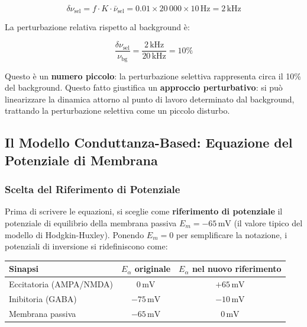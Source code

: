 \begin{equation}
\delta\nu_{\text{sel}} = f \cdot K \cdot \bar{\nu}_{\text{sel}} = 0.01 \times 20\,000 \times 10\,\text{Hz} = 2\,\text{kHz}
\end{equation}

La perturbazione relativa rispetto al background è:

\begin{equation}
\frac{\delta\nu_{\text{sel}}}{\nu_{\text{bg}}} = \frac{2\,\text{kHz}}{20\,\text{kHz}} = 10\%
\end{equation}

Questo è un \textbf{numero piccolo}: la perturbazione selettiva rappresenta circa il 10\% del background. Questo fatto giustifica un \textbf{approccio perturbativo}: si può linearizzare la dinamica attorno al punto di lavoro determinato dal background, trattando la perturbazione selettiva come un piccolo disturbo.


\subsection{Il Modello Conduttanza-Based: Equazione del Potenziale di Membrana}

\subsubsection{Scelta del Riferimento di Potenziale}

Prima di scrivere le equazioni, si sceglie come \textbf{riferimento di potenziale} il potenziale di equilibrio della membrana passiva $E_m = -65\,\text{mV}$ (il valore tipico del modello di Hodgkin-Huxley). Ponendo $E_m = 0$ per semplificare la notazione, i potenziali di inversione si ridefiniscono come:

\begin{table}[htbp]
    \centering
    \renewcommand{\arraystretch}{1.3}
    \begin{tabularx}{\textwidth}{|X|c|c|}
    \hline
    \textbf{Sinapsi} & \textbf{$E_\alpha$ originale} & \textbf{$E_\alpha$ nel nuovo riferimento} \\
    \hline
    Eccitatoria (AMPA/NMDA) & $0\,\text{mV}$ & $+65\,\text{mV}$ \\
    \hline
    Inibitoria (GABA) & $-75\,\text{mV}$ & $-10\,\text{mV}$ \\
    \hline
    Membrana passiva & $-65\,\text{mV}$ & $0\,\text{mV}$ \\
    \hline
    \end{tabularx}
\end{table}


